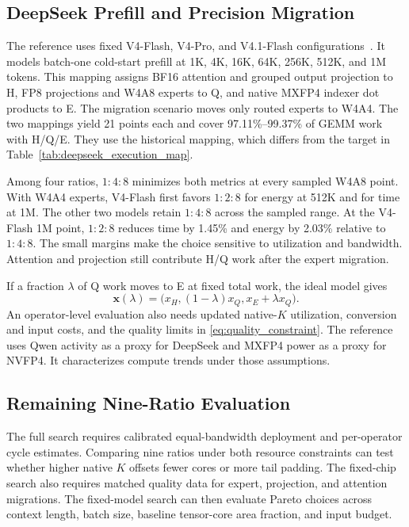 \documentclass[conference,9pt,letterpaper]{IEEEtran}
\begin{document}
\subsection{DeepSeek Prefill and Precision Migration}
\label{sec:k4_prefill}

The reference uses fixed V4-Flash, V4-Pro, and V4.1-Flash configurations~\cite{deepseekv4,deepseekv4flashsource,deepseekv4prosource,deepseekv41source}. It models batch-one cold-start prefill at 1K, 4K, 16K, 64K, 256K, 512K, and 1M tokens. This mapping assigns BF16 attention and grouped output projection to H, FP8 projections and W4A8 experts to Q, and native MXFP4 indexer dot products to E. The migration scenario moves only routed experts to W4A4. The two mappings yield 21 points each and cover 97.11\%--99.37\% of GEMM work with H/Q/E. They use the historical mapping, which differs from the target in Table~\ref{tab:deepseek_execution_map}.

Among four ratios, $1:4:8$ minimizes both metrics at every sampled W4A8 point. With W4A4 experts, V4-Flash first favors $1:2:8$ for energy at 512K and for time at 1M. The other two models retain $1:4:8$ across the sampled range. At the V4-Flash 1M point, $1:2:8$ reduces time by 1.45\% and energy by 2.03\% relative to $1:4:8$. The small margins make the choice sensitive to utilization and bandwidth. Attention and projection still contribute H/Q work after the expert migration.

If a fraction $\lambda$ of Q work moves to E at fixed total work, the ideal model gives
\begin{equation}
\boldsymbol x(\lambda)=
\bigl(x_H,(1-\lambda)x_Q,x_E+\lambda x_Q\bigr).
\label{eq:precision_migration}
\end{equation}
An operator-level evaluation also needs updated native-$K$ utilization, conversion and input costs, and the quality limits in \eqref{eq:quality_constraint}. The reference uses Qwen activity as a proxy for DeepSeek and MXFP4 power as a proxy for NVFP4. It characterizes compute trends under those assumptions.

\subsection{Remaining Nine-Ratio Evaluation}
\label{sec:dse_next_evaluation}

The full search requires calibrated equal-bandwidth deployment and per-operator cycle estimates. Comparing nine ratios under both resource constraints can test whether higher native $K$ offsets fewer cores or more tail padding. The fixed-chip search also requires matched quality data for expert, projection, and attention migrations. The fixed-model search can then evaluate Pareto choices across context length, batch size, baseline tensor-core area fraction, and input budget.
\end{document}
